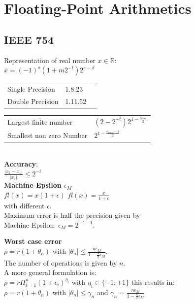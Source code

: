 \documentclass[english]{latex4ei/latex4ei_sheet}
\begin{document}
\section{Floating-Point Arithmetics}


\begin{sectionbox}
    \subsection{IEEE 754}
    Representation of real number $x\in\mathbb{R}$:\\

    $x = (-1)^s(1+m2^{-t})2^{e-\beta}$\\

    \begin{tabular}{lll}
        Single Precision & 1.8.23  \\
        Double Precision & 1.11.52 \\
    \end{tabular}

    \begin{tabular}{ll}
        Largest finite number    & $(2-2^{-t})2^{1-\frac{e_{max}}{2}}$ \\
        Smallest non zero Number & $2^{1-\frac{e_{max}-1}{2}}$
    \end{tabular}\\

    \textbf{Accuracy}:\\

    $\frac{\left|x_2 - x_1\right|}{\left|x_1\right|} \leq 2^{-t}$\\

    \textbf{Machine Epsilon $\epsilon_M$}\\

    $\textit{fl}(x) = x(1+\epsilon)$ \hfil $\textit{fl}(x) = \frac{x}{1+\epsilon}$\\
    with different $\epsilon$.\\

    Maximum error is half the precision given by \\
    Machine Epsilon: $\epsilon_M = 2^{-t-1}$.

    \textbf{Worst case error}\\
    $\rho = r(1+\theta_n)$ with $|\theta_n| \leq \frac{n\epsilon_M}{1-\frac{n}{2}\epsilon_M}$.\\
    The number of operations is given by $n$.\\

    A more general formulation is:\\
    $\rho = r\Pi_{i=1}^{n} (1+\epsilon_i)^{\eta_i}$ with $\eta_i \in \{-1;+1\}$ this results in:\\
    $\rho=r(1+\theta_n)$ with $|\theta_n| \leq \gamma_n$ and $\gamma_n = \frac{n\epsilon_M}{1-\frac{n}{2}\epsilon_M}$


\end{sectionbox}
\end{document}
